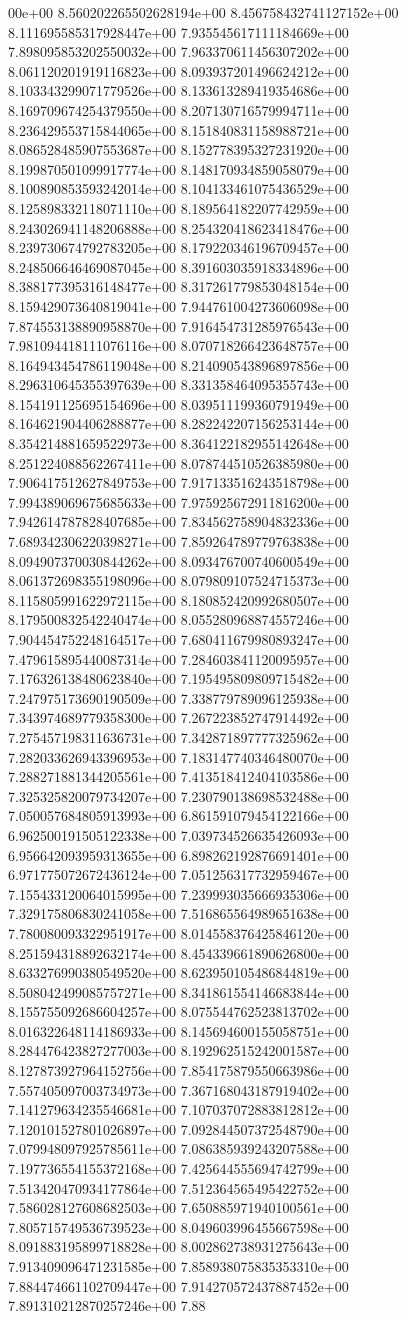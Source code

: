 00e+00	8.560202265502628194e+00	8.456758432741127152e+00	8.111695585317928447e+00	7.935545617111184669e+00	7.898095853202550032e+00	7.963370611456307202e+00	8.061120201919116823e+00	8.093937201496624212e+00	8.103343299071779526e+00	8.133613289419354686e+00	8.169709674254379550e+00	8.207130716579994711e+00	8.236429553715844065e+00	8.151840831158988721e+00	8.086528485907553687e+00	8.152778395327231920e+00	8.199870501099917774e+00	8.148170934859058079e+00	8.100890853593242014e+00	8.104133461075436529e+00	8.125898332118071110e+00	8.189564182207742959e+00	8.243026941148206888e+00	8.254320418623418476e+00	8.239730674792783205e+00	8.179220346196709457e+00	8.248506646469087045e+00	8.391603035918334896e+00	8.388177395316148477e+00	8.317261779853048154e+00	8.159429073640819041e+00	7.944761004273606098e+00	7.874553138890958870e+00	7.916454731285976543e+00	7.981094418111076116e+00	8.070718266423648757e+00	8.164943454786119048e+00	8.214090543896897856e+00	8.296310645355397639e+00	8.331358464095355743e+00	8.154191125695154696e+00	8.039511199360791949e+00	8.164621904406288877e+00	8.282242207156253144e+00	8.354214881659522973e+00	8.364122182955142648e+00	8.251224088562267411e+00	8.078744510526385980e+00	7.906417512627849753e+00	7.917133516243518798e+00	7.994389069675685633e+00	7.975925672911816200e+00	7.942614787828407685e+00	7.834562758904832336e+00	7.689342306220398271e+00	7.859264789779763838e+00	8.094907370030844262e+00	8.093476700740600549e+00	8.061372698355198096e+00	8.079809107524715373e+00	8.115805991622972115e+00	8.180852420992680507e+00	8.179500832542240474e+00	8.055280968874557246e+00	7.904454752248164517e+00	7.680411679980893247e+00	7.479615895440087314e+00	7.284603841120095957e+00	7.176326138480623840e+00	7.195495809809715482e+00	7.247975173690190509e+00	7.338779789096125938e+00	7.343974689779358300e+00	7.267223852747914492e+00	7.275457198311636731e+00	7.342871897777325962e+00	7.282033626943396953e+00	7.183147740346480070e+00	7.288271881344205561e+00	7.413518412404103586e+00	7.325325820079734207e+00	7.230790138698532488e+00	7.050057684805913993e+00	6.861591079454122166e+00	6.962500191505122338e+00	7.039734526635426093e+00	6.956642093959313655e+00	6.898262192876691401e+00	6.971775072672436124e+00	7.051256317732959467e+00	7.155433120064015995e+00	7.239993035666935306e+00	7.329175806830241058e+00	7.516865564989651638e+00	7.780080093322951917e+00	8.014558376425846120e+00	8.251594318892632174e+00	8.454339661890626800e+00	8.633276990380549520e+00	8.623950105486844819e+00	8.508042499085757271e+00	8.341861554146683844e+00	8.155755092686604257e+00	8.075544762523813702e+00	8.016322648114186933e+00	8.145694600155058751e+00	8.284476423827277003e+00	8.192962515242001587e+00	8.127873927964152756e+00	7.854175879550663986e+00	7.557405097003734973e+00	7.367168043187919402e+00	7.141279634235546681e+00	7.107037072883812812e+00	7.120101527801026897e+00	7.092844507372548790e+00	7.079948097925785611e+00	7.086385939243207588e+00	7.197736554155372168e+00	7.425644555694742799e+00	7.513420470934177864e+00	7.512364565495422752e+00	7.586028127608682503e+00	7.650885971940100561e+00	7.805715749536739523e+00	8.049603996455667598e+00	8.091883195899718828e+00	8.002862738931275643e+00	7.913409096471231585e+00	7.858938075835353310e+00	7.884474661102709447e+00	7.914270572437887452e+00	7.891310212870257246e+00	7.88